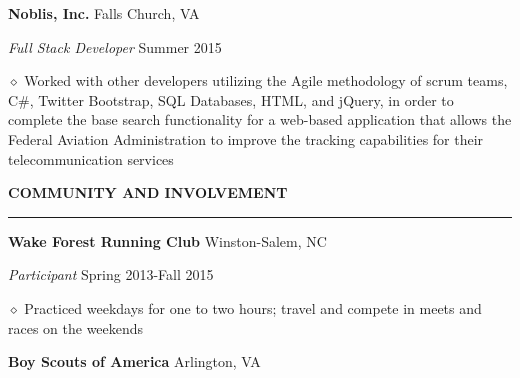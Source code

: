 \documentclass[executivepaper]{extarticle}
\begin{document}
\begin{center}
{\begin{minipage}{7.0in}
\vspace{2mm}

{\noindent \textbf{\fontsize{12}{8}\selectfont Noblis, Inc.}} {\hfill \fontsize{10}{8}\selectfont Falls Church, VA}

\vspace{0.25mm}

{\noindent \textit{\fontsize{12}{8}\selectfont Full Stack Developer}} {\hfill \fontsize{10}{8}\selectfont Summer 2015}

\vspace{0.25mm}

{\noindent $\diamond$ {\fontsize{12}{8}\selectfont Worked with other developers utilizing the Agile methodology of scrum teams, C\#, Twitter Bootstrap, SQL Databases, HTML, and jQuery, in order to complete
the base search functionality for a web-based application that allows the Federal Aviation Administration to improve the tracking capabilities for their telecommunication services}}

\vspace{3mm}


{\noindent \textbf{\fontsize{12}{9}\selectfont COMMUNITY AND INVOLVEMENT}}

\vspace{-3mm}

\noindent \rule{\textwidth}{0.5pt}

\vspace{0.5mm}

{\noindent \textbf{\fontsize{12}{8}\selectfont Wake Forest Running Club}} {\hfill \fontsize{10}{8}\selectfont Winston-Salem, NC}

\vspace{0.25mm}

{\noindent \textit{\fontsize{12}{8}\selectfont Participant}} {\hfill \fontsize{10}{8}\selectfont Spring 2013-Fall 2015}

\vspace{0.25mm}

{\noindent $\diamond$ {\fontsize{12}{8}\selectfont Practiced weekdays for one to two hours; travel and compete in meets and races on the weekends}}

\vspace{2mm}

{\noindent \textbf{\fontsize{12}{8}\selectfont Boy Scouts of America}} {\hfill \fontsize{10}{8}\selectfont Arlington, VA}


\end{minipage}}
\end{center}
\end{document}
